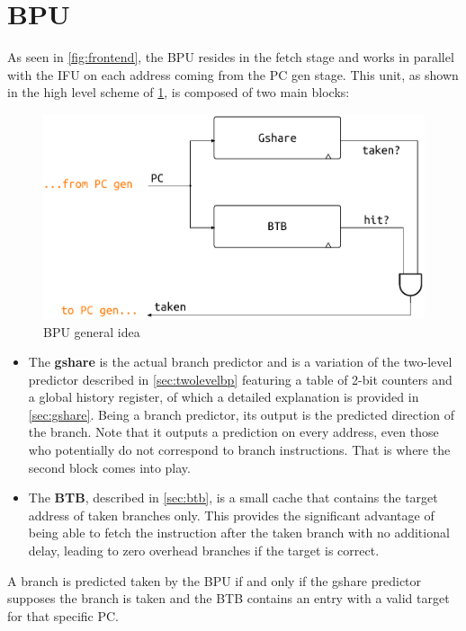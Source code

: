 \section{\acf{BPU}}
As seen in \cref{fig:frontend}, the \ac{BPU} resides in the fetch stage and works in parallel with the \ac{IFU} on each address coming from the \ac{PC} gen stage. This unit, as shown in the high level scheme of \cref{fig:bpu-idea}, is composed of two main blocks:
\begin{figure}[hbt]
  \centering
  \includegraphics[width=.9\textwidth]{img/bpu-idea.pdf}
  \caption{\acs{BPU} general idea}
  \label{fig:bpu-idea}
\end{figure}
\begin{itemize}
  \item The \textbf{gshare} is the actual branch predictor and is a variation of the two-level predictor described in \cref{sec:twolevelbp} featuring a table of 2-bit counters and a global history register, of which a detailed explanation is provided in \cref{sec:gshare}. Being a branch predictor, its output is the predicted direction of the branch. Note that it outputs a prediction on every address, even those who potentially do not correspond to branch instructions. That is where the second block comes into play.
  \item The \textbf{\acf{BTB}}, described in \cref{sec:btb}, is a small cache that contains the target address of taken branches only. This provides the significant advantage of being able to fetch the instruction after the taken branch with no additional delay, leading to zero overhead branches if the target is correct.
\end{itemize}
A branch is predicted taken by the \ac{BPU} if and only if the gshare predictor supposes the branch is taken and the \ac{BTB} contains an entry with a valid target for that specific \ac{PC}.

